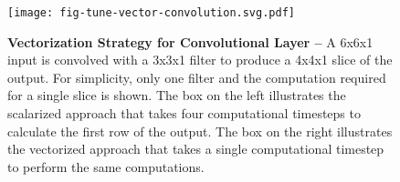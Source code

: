 
\begin{figure}[t]

  \centering
  \texttt{[image: fig-tune-vector-convolution.svg.pdf]}

  \caption{\textbf{Vectorization Strategy for Convolutional Layer --} A
    6x6x1 input is convolved with a 3x3x1 filter to produce a 4x4x1 slice
    of the output. For simplicity, only one filter and the computation
    required for a single slice is shown. The box on the left illustrates
    the scalarized approach that takes four computational timesteps to
    calculate the first row of the output. The box on the
    right illustrates the vectorized approach that takes a single
    computational timestep to perform the same computations.}

  \label{fig-tuning-vectorization-convolution}

\end{figure}
